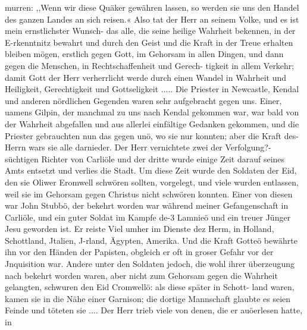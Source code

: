 murren: ,,Wenn wir diese Quäker gewähren lassen, so werden sie
uns den Handel des ganzen Landes an sich reisen.« Also tat
der Herr an seinem Volke, und es ist mein ernstlichster Wunsch-
das alle, die seine heilige Wahrheit bekennen, in der E-rkenntnitz
bewahrt und durch den Geist und die Kraft in der Treue erhalten
bleiben mögen, erstlich gegen Gott, im Gehorsam in allen Dingen,
und dann gegen die Menschen, in Rechtschaffenheit und Gerech-
tigkeit in allem Verkehr; damit Gott der Herr verherrlicht werde
durch einen Wandel in Wahrheit und Heiligkeit, Gerechtigkeit und
Gottseligkeit .....
Die Priester in Newcastle, Kendal und anderen nördlichen
Gegenden waren sehr aufgebracht gegen uns. Einer, uamens
Gilpin, der manchmal zu uns nach Kendal gekommen war, war
bald von der Wahrheit abgefallen und aus allerlei einfältige
Gedanken gekommen, und die Priester gebrauchten nun das gegen
unö, wo sie nur konnten; aber die Kraft des- Herrn wars sie
alle darnieder. Der Herr vernichtete zwei der Verfolgung?-süchtigen
Richter von Carliöle und der dritte wurde einige Zeit darauf
seines Amts entsetzt und verlies die Stadt.
Um diese Zeit wurde den Soldaten der Eid, den sie Oliwer
Eromwell schwören sollten, vorgelegt, und viele wurden entlassen,
weil sie im Gehorsam gegen Christus nicht schwören konnten.
Einer von diesen war John Stubbö, der bekehrt worden war
während meiner Gefangenschaft in Carliöle, und ein guter Soldat
im Kampfe de-3 Lamnieö und ein treuer Jünger Jesu geworden
ist. Er reiste Viel umher im Dienste dez Herm, in Holland,
Schottland, Jtalien, J-rland, Ägypten, Amerika. Und die Kraft
Gotteö bewährte ihn vor den Händen der Papisten, obgleich er
oft in groser Gefahr vor der Jnquisition war. Andere unter
den Soldaten jedoch, die wohl ihrer überzeugung nach bekehrt
worden waren, aber nicht zum Gehorsam gegen die Wahrheit
gelangten, schwuren den Eid Cromwellö: als diese später in Schott-
land waren, kamen sie in die Nähe einer Garnison; die dortige
Mannschaft glaubte es seien Feinde und töteten sie ....
Der Herr trieb viele von denen, die er auöerlesen hatte, in


